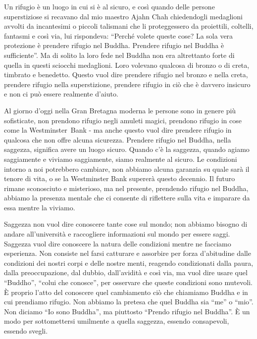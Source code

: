 Un rifugio è un luogo in cui si è al sicuro, e così quando delle persone
superstiziose si recavano dal mio maestro Ajahn Chah chiedendogli
medaglioni avvolti da incantesimi o piccoli talismani che li
proteggessero da proiettili, coltelli, fantasmi e così via, lui
rispondeva: ``Perché volete queste cose? La sola vera protezione è
prendere rifugio nel Buddha. Prendere rifugio nel Buddha è
sufficiente''. Ma di solito la loro fede nel Buddha non era altrettanto
forte di quella in questi sciocchi medaglioni. Loro volevano qualcosa di
bronzo o di creta, timbrato e benedetto. Questo vuol dire prendere
rifugio nel bronzo e nella creta, prendere rifugio nella superstizione,
prendere rifugio in ciò che è davvero insicuro e non ci può essere
realmente d'aiuto.

Al giorno d'oggi nella Gran Bretagna moderna le persone sono in genere
più sofisticate, non prendono rifugio negli amuleti magici, prendono
rifugio in cose come la Westminster~Bank - ma anche questo vuol dire
prendere rifugio in qualcosa che non offre alcuna sicurezza. Prendere
rifugio nel Buddha, nella saggezza, significa avere un luogo sicuro.
Quando c'è la saggezza, quando agiamo saggiamente e viviamo saggiamente,
siamo realmente al sicuro. Le condizioni intorno a noi potrebbero
cambiare, non abbiamo alcuna garanzia su quale sarà il tenore di vita, o
se la Westminster Bank supererà questo decennio. Il futuro rimane
sconosciuto e misterioso, ma nel presente, prendendo rifugio nel Buddha,
abbiamo la presenza mentale che ci consente di riflettere sulla vita e
imparare da essa mentre la viviamo.

Saggezza non vuol dire conoscere tante cose sul mondo; non abbiamo
bisogno di andare all'università e raccogliere informazioni sul mondo
per essere saggi. Saggezza vuol dire conoscere la natura delle
condizioni mentre ne facciamo esperienza. Non consiste nel farsi
catturare e assorbire per forza d'abitudine dalle condizioni dei nostri
corpi e delle nostre menti, reagendo condizionati dalla paura, dalla
preoccupazione, dal dubbio, dall'avidità e così via, ma vuol dire usare
quel ``Buddho'', ``colui che conosce'', per osservare che queste
condizioni sono mutevoli. È proprio l'atto del conoscere quel
cambiamento ciò che chiamiamo Buddha e in cui prendiamo rifugio. Non
abbiamo la pretesa che quel Buddha sia ``me'' o ``mio''. Non diciamo
``Io sono Buddha'', ma piuttosto ``Prendo rifugio nel Buddha''. È un
modo per sottomettersi umilmente a quella saggezza, essendo consapevoli,
essendo svegli.

